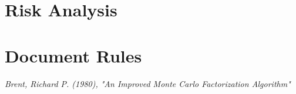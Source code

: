 \documentclass[a4paper]{article}
\begin{document}
\section{Risk Analysis}
\label{sec:risk_analysis}

\section{Document Rules} 
\label{sec:document_rules}



\begin{thebibliography}{99}     
	
 \emph{Brent, Richard P. (1980), "An Improved Monte Carlo Factorization Algorithm"}

\end{thebibliography}
\end{document}
